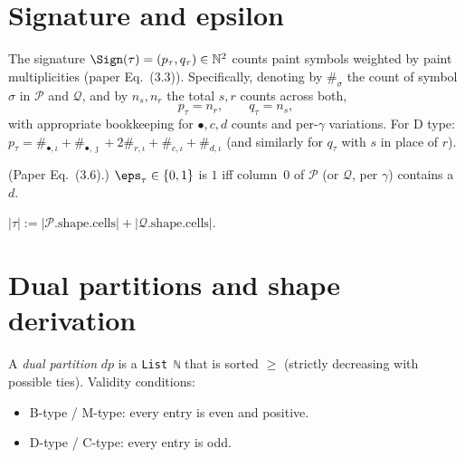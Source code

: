 \section{Signature and epsilon}

\begin{definition}
  \label{def:signature_pbp}
  \leanok
  The signature $\Sign(\tau) = (p_\tau, q_\tau) \in \mathbb{N}^2$ counts paint
  symbols weighted by paint multiplicities (paper Eq.~(3.3)). Specifically,
  denoting by $\#_\sigma$ the count of symbol $\sigma$ in $\mathcal{P}$ and $\mathcal{Q}$,
  and by $n_s, n_r$ the total $s, r$ counts across both,
  \[
    p_\tau = n_r, \qquad q_\tau = n_s,
  \]
  with appropriate bookkeeping for $\bullet, c, d$ counts and per-$\gamma$ variations.
  For D type: $p_\tau = \#_{\bullet,\iota} + \#_{\bullet,\jmath} + 2\#_{r,\iota} + \#_{c,\iota} + \#_{d,\iota}$ (and similarly for $q_\tau$ with $s$ in place of $r$).
\end{definition}

\begin{definition}
  \label{def:epsilon_pbp}
  \leanok
  (Paper Eq.~(3.6).) $\eps_\tau \in \{0, 1\}$ is $1$ iff column~0 of $\mathcal{P}$ (or $\mathcal{Q}$, per $\gamma$) contains a $d$.
\end{definition}

\begin{definition}
  \label{def:cardCells}
  \leanok
  $|\tau| := |\mathcal{P}.\mathrm{shape}.\mathrm{cells}| + |\mathcal{Q}.\mathrm{shape}.\mathrm{cells}|$.
\end{definition}

\section{Dual partitions and shape derivation}

\begin{definition}
  \label{def:DualPart}
  \leanok
  A \emph{dual partition} $dp$ is a \texttt{List ℕ} that is sorted $\geq$ (strictly decreasing with possible ties). Validity conditions:
  \begin{itemize}
    \item B-type / M-type: every entry is even and positive.
    \item D-type / C-type: every entry is odd.
  \end{itemize}
\end{definition}

